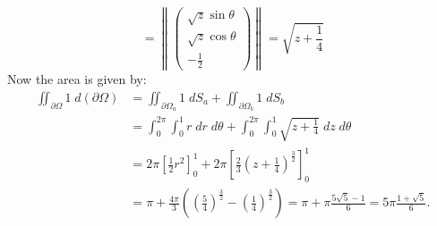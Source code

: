 \documentclass[11pt]{article}
\begin{document}
\begin{solution}
\[        = 
        \left\|\begin{pmatrix} \sqrt{z}\sin\theta \\ \sqrt{z}\cos\theta\\-\frac{1}{2} \end{pmatrix}\right\| 
        = 
        \sqrt{z+\frac{1}{4}}
    \]
    Now the area is given by:
    \begin{align*}
        \iint_{\partial\Omega} 1 \;d (\partial \Omega)
        &
        =
        \iint_{\partial\Omega_a} 1 \;dS_a + 	\iint_{\partial\Omega_b} 1 \;dS_b
        \\&
        = \int_0^{2\pi} \int_0^1 r \;d r\;d\theta + \int_0^{2\pi} \int_0^1\sqrt{z+\frac{1}{4}}\;d z \;d \theta
        \\&
        = 
        2\pi\left[\frac{1}{2}r^2\right]_0^1 + 2\pi\left[\frac{2}{3}\left(z+\frac{1}{4}\right)^{\frac{3}{2}}\right]_0^1
        \\&
        = 
        \pi + \frac{4\pi}{3}\left(\left(\frac{5}{4}\right)^{\frac{3}{2}} - \left(\frac{1}{4}\right)^{\frac{3}{2}}\right)
        = 
        \pi + \pi \frac{5\sqrt{5} - 1}{6}
        = 
        5\pi \frac{1 + \sqrt{5}}{6}
        .
    \end{align*}
\end{solution}
\end{document}
